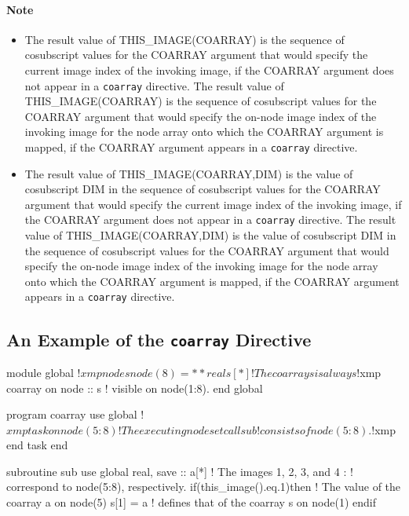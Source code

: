 \paragraph*{Note}
\begin{itemize}
 \item 
       The result value of THIS\_IMAGE(COARRAY)
       is the sequence of cosubscript
       values for the COARRAY argument that would specify the current image index of
       the invoking image, if the COARRAY argument does not appear in a
       {\tt coarray} directive.
       The result value of THIS\_IMAGE(COARRAY)
       is the sequence of cosubscript
       values for the COARRAY argument that would specify the on-node image index of the invoking image
for the node array onto which the COARRAY argument is mapped,
       if the COARRAY argument appears in a {\tt coarray} directive.	      

 \item 

       The result value of THIS\_IMAGE(COARRAY,DIM) is
       the value
       of cosubscript DIM in the sequence of cosubscript values
       for the COARRAY argument that would specify the current image index of
       the invoking image, if the COARRAY argument does not appear in a
       {\tt coarray} directive.
       The result value of THIS\_IMAGE(COARRAY,DIM) is
       the value
       of cosubscript DIM in the sequence of cosubscript values
       for the COARRAY argument that would specify the on-node image index of
       the invoking image for the node array
       onto which the COARRAY argument is mapped,
       if the COARRAY argument appears in a {\tt coarray}
       directive.
\end{itemize}


\subsection{An Example of the {\tt coarray} Directive}


\begin{XFexample}
      module global
!$xmp nodes node(8)=**    
      real s[*]             ! The coarray s is always 
!$xmp coarray on node :: s  ! visible on node(1:8).
      end global

      program coarray
      use global
!$xmp task on node(5:8)     ! The executing node set 
        call sub            ! consists of node(5:8).
!$xmp end task
      end

      subroutine sub
      use global
      real, save :: a[*]    ! The images 1, 2, 3, and 4 
         :                  ! correspond to node(5:8), respectively.
      if(this_image().eq.1)then ! The value of the coarray a on node(5) 
         s[1] = a               ! defines that of the coarray s on node(1)
      endif
\end{XFexample}


